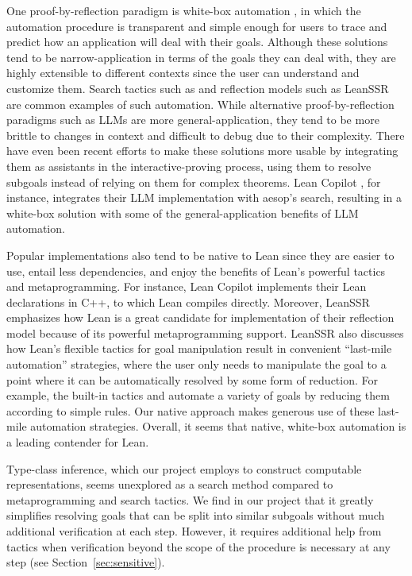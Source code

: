 One proof-by-reflection paradigm is white-box automation \cite{Aesop2023}, in which the automation procedure is transparent and simple enough for users to trace and predict how an application will deal with their goals. Although these solutions tend to be narrow-application in terms of the goals they can deal with, they are highly extensible to different contexts since the user can understand and customize them. Search tactics such as  \cite{Aesop2023} and reflection models such as LeanSSR \cite{SmallScaleReflection2024} are common examples of such automation. While alternative proof-by-reflection paradigms such as LLMs are more general-application, they tend to be more brittle to changes in context and difficult to debug due to their complexity. There have even been recent efforts to make these solutions more usable by integrating them as assistants in the interactive-proving process, using them to resolve subgoals instead of relying on them for complex theorems. Lean Copilot \cite{LeanCopilot2025}, for instance, integrates their LLM implementation with aesop’s search, resulting in a white-box solution with some of the general-application benefits of LLM automation.

Popular implementations also tend to be native to Lean since they are easier to use, entail less dependencies, and enjoy the benefits of Lean's powerful tactics and metaprogramming. For instance, Lean Copilot \cite{LeanCopilot2025} implements their Lean declarations in C++, to which Lean compiles directly. Moreover, LeanSSR \cite{SmallScaleReflection2024} emphasizes how Lean is a great candidate for implementation of their reflection model because of its powerful metaprogramming support. LeanSSR also discusses how Lean's flexible tactics for goal manipulation result in convenient ``last-mile automation'' strategies, where the user only needs to manipulate the goal to a point where it can be automatically resolved by some form of reduction. For example, the built-in tactics  and  automate a variety of goals by reducing them according to simple rules. Our native approach makes generous use of these last-mile automation strategies. Overall, it seems that native, white-box automation is a leading contender for Lean.

Type-class inference, which our project employs to construct computable representations, seems unexplored as a search method compared to metaprogramming and search tactics. We find in our project that it greatly simplifies resolving goals that can be split into similar subgoals without much additional verification at each step. However, it requires additional help from tactics when verification beyond the scope of the procedure is necessary at any step (see Section~\ref{sec:sensitive}).


